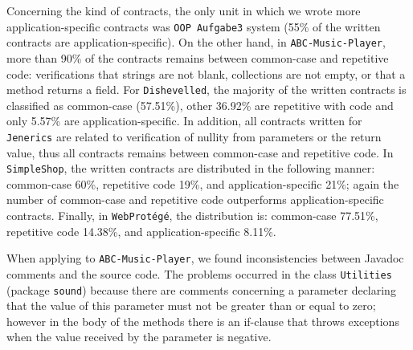 Concerning the kind of contracts, the only unit in which we wrote more
application-specific contracts was \texttt{OOP Aufgabe3} system (55\% of the
written contracts are application-specific). On the other hand, in \texttt{ABC-Music-Player}, more than 90\% of the contracts remains between common-case and
repetitive code: verifications that strings are not blank, collections are not
empty, or that a method returns a field.
For \texttt{Dishevelled}, the majority of the written contracts is classified as common-case
(57.51\%), other 36.92\% are repetitive with code and only 5.57\% are application-specific.
In addition, all contracts written for \texttt{Jenerics} are related to
verification of nullity from parameters or the return value, thus all contracts
remains between common-case and repetitive code. In \texttt{SimpleShop}, the
written contracts are distributed in the following manner: common-case 60\%, repetitive code 19\%, and application-specific 21\%; again the number of common-case and repetitive code outperforms application-specific contracts. Finally,
in \texttt{WebProt\'{e}g\'{e}}, the distribution is: common-case 77.51\%, repetitive code 14.38\%, and application-specific 8.11\%.  

When applying \contractjdoc{} to \texttt{ABC-Music-Player}, we found inconsistencies between Javadoc
comments and the source code. The problems occurred in the class \texttt{Utilities} (package
\texttt{sound}) because there are comments concerning a parameter declaring that the value of
this parameter must not be greater than or equal to zero; however in the body of the methods there
is an if-clause that throws exceptions when the value received by the parameter is negative.




